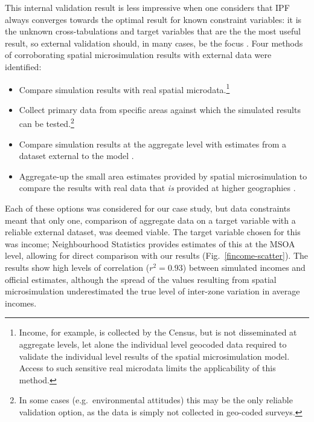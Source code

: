 This internal validation
result is less impressive when one considers that IPF always converges
towards the optimal result for known constraint variables:
it is the unknown cross-tabulations and
target variables that are the the most useful result,
so external validation should, in many cases, be the focus
\citep{Morrissey2008, edwards2013validation}.
Four methods of corroborating spatial microsimulation results with external
data were identified:
\begin{itemize}
 \item Compare simulation results with real spatial microdata.\footnote{Income,
for example, is collected by the Census, but is not disseminated at aggregate
levels, let alone the individual level geocoded data required to validate the
individual level results of the spatial microsimulation model. Access to such
sensitive real microdata limits the applicability of this method.}
\item Collect primary data from specific areas against which the simulated
results can be tested.\footnote{In some cases (e.g.~environmental attitudes)
this may be the only reliable validation option, as the data is simply not
collected in geo-coded surveys.}
\item Compare simulation results at the aggregate level with estimates
from a dataset external to the model \citep{Morrissey2013}.
\item Aggregate-up the small area estimates provided by spatial microsimulation
to compare the results with real data that \emph{is} provided at higher
geographies \citep{Edwards2009}.
\end{itemize}
Each of these options was considered for our case study,
but data constraints meant that only one, comparison of aggregate data
on a target variable with a reliable external dataset, was deemed viable.
The target variable chosen for this was income; Neighbourhood Statistics
provides estimates of this at the MSOA level, allowing
for direct comparison with our results (Fig.~\ref{fincome-scatter}). The results show
high levels of correlation ($r^2 = 0.93$) between simulated incomes and official
estimates, although the spread of the values resulting from spatial microsimulation
underestimated the true level of inter-zone variation in average incomes.

